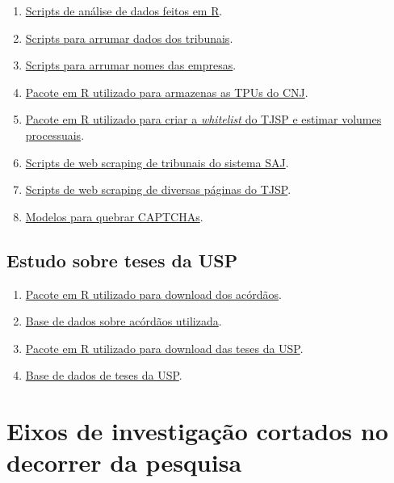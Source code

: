 \documentclass[]{report}
\providecommand{\tightlist}{%
  \setlength{\itemsep}{0pt}\setlength{\parskip}{0pt}}
\begin{document}
\begin{enumerate}
\def\labelenumi{\arabic{enumi}.}
\tightlist
\item
  \href{https://github.com/abjur/cnjML}{Scripts de análise de dados
  feitos em R}.
\item
  \href{https://github.com/abjur/tidyML}{Scripts para arrumar dados dos
  tribunais}.
\item
  \href{https://github.com/abjur/tidyPJ}{Scripts para arrumar nomes das
  empresas}.
\item
  \href{https://github.com/abjur/tpur}{Pacote em R utilizado para
  armazenas as TPUs do CNJ}.
\item
  \href{https://github.com/abjur/tpur}{Pacote em R utilizado para criar
  a \emph{whitelist} do TJSP e estimar volumes processuais}.
\item
  \href{https://github.com/courtsbr/esaj}{Scripts de web scraping de
  tribunais do sistema SAJ}.
\item
  \href{https://github.com/courtsbr/tjsp}{Scripts de web scraping de
  diversas páginas do TJSP}.
\item
  \href{https://github.com/decryptr/}{Modelos para quebrar CAPTCHAs}.
\end{enumerate}

\subsection{Estudo sobre teses da USP}\label{estudo-sobre-teses-da-usp}

\begin{enumerate}
\def\labelenumi{\arabic{enumi}.}
\tightlist
\item
  \href{https://github.com/abjur/esaj}{Pacote em R utilizado para
  download dos acórdãos}.
\item
  \href{https://www.dropbox.com/s/kkqlghd5cv10u99/d_ementas_2014.rda?dl=0}{Base
  de dados sobre acórdãos utilizada}.
\item
  \href{https://github.com/abjur/teses.usp}{Pacote em R utilizado para
  download das teses da USP}.
\item
  \href{https://github.com/jtrecenti/teses.usp/raw/master/data/teses_usp.rda}{Base
  de dados de teses da USP}.
\end{enumerate}

\section{Eixos de investigação cortados no decorrer da
pesquisa}\label{eixos-de-investigacao-cortados-no-decorrer-da-pesquisa}
\end{document}
